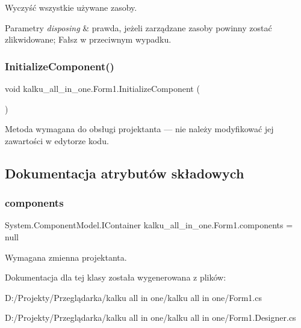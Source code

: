 Wyczyść wszystkie używane zasoby. 


\begin{DoxyParams}{Parametry}
{\em disposing} & prawda, jeżeli zarządzane zasoby powinny zostać zlikwidowane; Fałsz w przeciwnym wypadku.\\
\hline
\end{DoxyParams}
\mbox{\label{classkalku__all__in__one_1_1_form1_acfb7737bb18b9292d406dc92c735c492}} 
\subsubsection{\texorpdfstring{InitializeComponent()}{InitializeComponent()}}
{\footnotesize\ttfamily void kalku\+\_\+all\+\_\+in\+\_\+one.\+Form1.\+Initialize\+Component (\begin{DoxyParamCaption}{ }\end{DoxyParamCaption})\hspace{0.3cm}{\ttfamily [private]}}



Metoda wymagana do obsługi projektanta — nie należy modyfikować jej zawartości w edytorze kodu. 



\subsection{Dokumentacja atrybutów składowych}
\mbox{\label{classkalku__all__in__one_1_1_form1_a6435b7f5e458b4998b1dd1be91d3773d}} 
\subsubsection{\texorpdfstring{components}{components}}
{\footnotesize\ttfamily System.\+Component\+Model.\+I\+Container kalku\+\_\+all\+\_\+in\+\_\+one.\+Form1.\+components = null\hspace{0.3cm}{\ttfamily [private]}}



Wymagana zmienna projektanta. 



Dokumentacja dla tej klasy została wygenerowana z plików\+:\begin{DoxyCompactItemize}
\item 
D\+:/\+Projekty/\+Przeglądarka/kalku all in one/kalku all in one/Form1.\+cs\item 
D\+:/\+Projekty/\+Przeglądarka/kalku all in one/kalku all in one/Form1.\+Designer.\+cs\end{DoxyCompactItemize}
